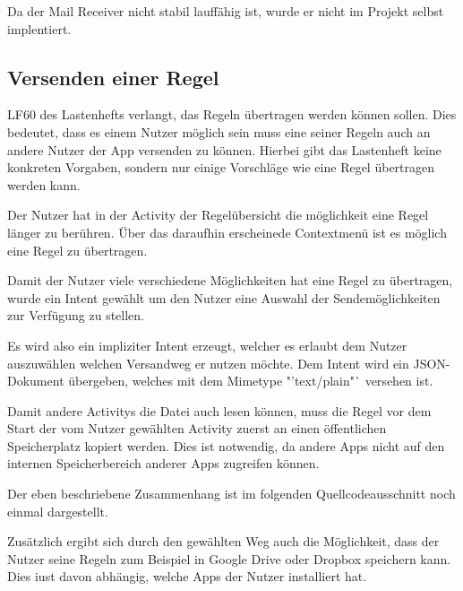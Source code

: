 Da der Mail Receiver nicht stabil lauff\"ahig ist, wurde er nicht im Projekt selbst implentiert.

\subsection{Versenden einer Regel}
LF60 des Lastenhefts verlangt, das Regeln \"ubertragen werden k\"onnen sollen. Dies bedeutet, dass es einem Nutzer m\"oglich sein muss eine seiner Regeln auch an andere Nutzer der App versenden zu k\"onnen. Hierbei gibt das Lastenheft keine konkreten Vorgaben, sondern nur einige Vorschl\"age wie eine Regel \"ubertragen werden kann.

Der Nutzer hat in der Activity der Regel\"ubersicht die m\"oglichkeit eine Regel l\"anger zu ber\"uhren. \"Uber das daraufhin erscheinede Contextmen\"u ist es m\"oglich eine Regel zu \"ubertragen.

Damit der Nutzer viele verschiedene M\"oglichkeiten hat eine Regel zu \"ubertragen, wurde ein Intent gew\"ahlt um den Nutzer eine Auswahl der Sendem\"oglichkeiten zur Verf\"ugung zu stellen.

Es wird also ein impliziter Intent erzeugt, welcher es erlaubt dem Nutzer auszuw\"ahlen welchen Versandweg er nutzen m\"ochte. Dem Intent wird ein JSON-Dokument \"ubergeben, welches mit dem Mimetype "'text/plain"` versehen ist.

Damit andere Activitys die Datei auch lesen k\"onnen, muss die Regel vor dem Start der vom Nutzer gew\"ahlten Activity zuerst an einen \"offentlichen Speicherplatz kopiert werden.
Dies ist notwendig, da andere Apps nicht auf den internen Speicherbereich anderer Apps zugreifen k\"onnen.

Der eben beschriebene Zusammenhang ist im folgenden Quellcodeausschnitt noch einmal dargestellt. \cite{AttachFileToIntent}



Zus\"atzlich ergibt sich durch den gew\"ahlten Weg auch die M\"oglichkeit, dass der Nutzer seine Regeln zum Beispiel in Google Drive oder Dropbox speichern kann. Dies iust davon abh\"angig, welche Apps der Nutzer installiert hat.